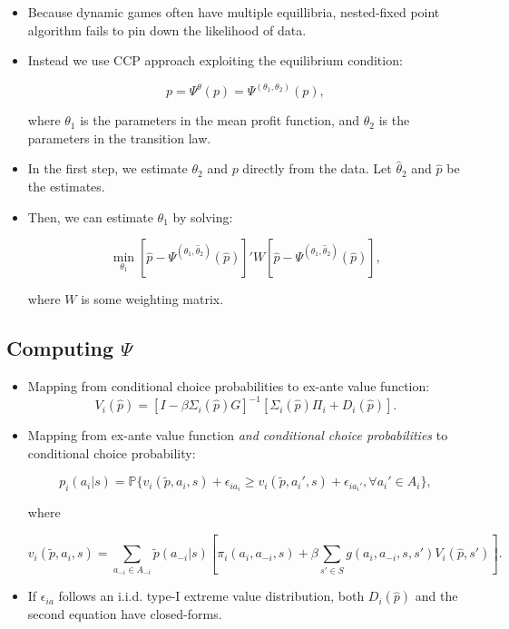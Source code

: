 \documentclass[]{book}
\providecommand{\tightlist}{%
  \setlength{\itemsep}{0pt}\setlength{\parskip}{0pt}}
\begin{document}
\begin{itemize}
\tightlist
\item
  Because dynamic games often have multiple equillibria, nested-fixed
  point algorithm fails to pin down the likelihood of data.
\item
  Instead we use CCP approach exploiting the equilibrium condition:

  \begin{equation}
  p = \Psi^\theta(p) = \Psi^{(\theta_1, \theta_2)}(p),
  \end{equation}

  where \(\theta_1\) is the parameters in the mean profit function, and
  \(\theta_2\) is the parameters in the transition law.
\item
  In the first step, we estimate \(\theta_2\) and \(p\) directly from
  the data. Let \(\hat{\theta}_2\) and \(\hat{p}\) be the estimates.
\item
  Then, we can estimate \(\theta_1\) by solving:

  \begin{equation}
  \min_{\theta_1} [\hat{p} - \Psi^{(\theta_1, \hat{\theta}_2)}(\hat{p})]' W [\hat{p} - \Psi^{(\theta_1, \hat{\theta}_2)}(\hat{p})],
  \end{equation}

  where \(W\) is some weighting matrix.
\end{itemize}

\subsection{\texorpdfstring{Computing
\(\Psi\)}{Computing \textbackslash{}Psi}}\label{computing-psi}

\begin{itemize}
\item
  Mapping from conditional choice probabilities to ex-ante value
  function: \[
  V_i(\hat{p}) = [I - \beta \Sigma_i(\hat{p})G]^{-1} [\Sigma_i(\hat{p})\Pi_i + D_i(\hat{p})].
  \]
\item
  Mapping from ex-ante value function
  \textit{and conditional choice probabilities} to conditional choice
  probability:

  \begin{equation}
  p_i(a_i|s) =  \mathbb{P}\{v_i(\tilde{p}, a_i, s) + \epsilon_{ia_i} \ge  v_i(\tilde{p}, a_i', s) + \epsilon_{ia_i'}, \forall a_i' \in A_i\},
  \end{equation}

  where

  \begin{equation}
  v_i(\tilde{p}, a_i, s) = \sum_{a_{-i} \in A_{-i}} \tilde{p}(a_{-i}|s) [\pi_i(a_i, a_{-i}, s) + \beta \sum_{s' \in S} g(a_i, a_{-i}, s, s') V_i(\hat{p}, s')].
  \end{equation}
\item
  If \(\epsilon_{ia}\) follows an i.i.d. type-I extreme value
  distribution, both \(D_i(\hat{p})\) and the second equation have
  closed-forms.
\end{itemize}
\end{document}

